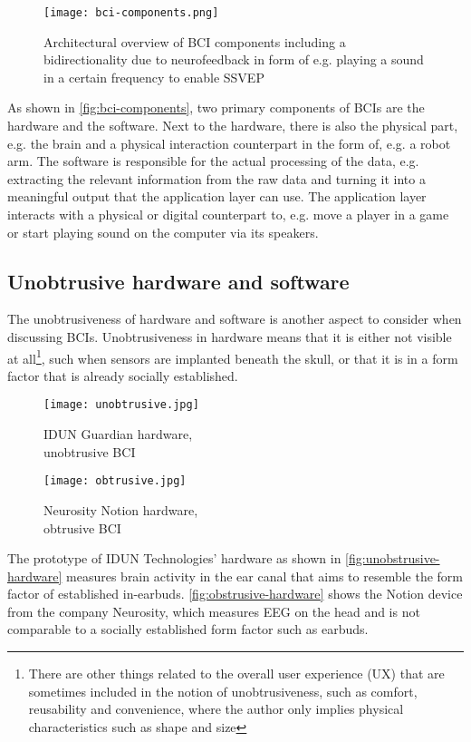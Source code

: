 \begin{figure}[ht]
  \centering
  \texttt{[image: bci-components.png]}
  \caption{Architectural overview of BCI components including a bidirectionality due to neurofeedback in form of e.g. playing a sound in a certain frequency to enable SSVEP}
  \label{fig:bci-components}
\end{figure}

As shown in \autoref{fig:bci-components}, two primary components of BCIs are the hardware and the software. Next to the hardware, there is also the physical part, e.g. the brain and a physical interaction counterpart in the form of, e.g. a robot arm. The software is responsible for the actual processing of the data, e.g. extracting the relevant information from the raw data and turning it into a meaningful output that the application layer can use. The application layer interacts with a physical or digital counterpart to, e.g. move a player in a game or start playing sound on the computer via its speakers.

\subsection{Unobtrusive hardware and software}
\label{chapter2-unobtrusive-hardware-and-software}

The unobtrusiveness of hardware and software is another aspect to consider when discussing BCIs. Unobtrusiveness in hardware means that it is either not visible at all\footnote{There are other things related to the overall user experience (UX) that are sometimes included in the notion of unobtrusiveness, such as comfort, reusability and convenience, where the author only implies physical characteristics such as shape and size}, such when sensors are implanted beneath the skull, or that it is in a form factor that is already socially established.

\begin{figure}[!ht]
  \texttt{[image: unobtrusive.jpg]}
  \caption{IDUN Guardian hardware, \\ unobtrusive BCI}
  \label{fig:unobstrusive-hardware}
  \endminipage\hfill
  \texttt{[image: obtrusive.jpg]}
  \caption{Neurosity Notion hardware, \\ obtrusive BCI}
  \label{fig:obstrusive-hardware}
  \endminipage\hfill
\end{figure}

The prototype of IDUN Technologies' hardware as shown in \autoref{fig:unobstrusive-hardware} measures brain activity in the ear canal that aims to resemble the form factor of established in-earbuds. \autoref{fig:obstrusive-hardware} shows the Notion device from the company Neurosity, which measures EEG on the head and is not comparable to a socially established form factor such as earbuds.

